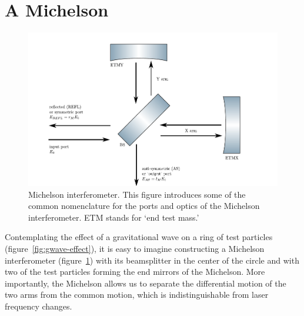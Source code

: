 \section{A Michelson}
\begin{figure}
\centering\includegraphics{figures/michelson.pdf}
\caption[Michelson interferometer]{\label{fig:michelson}Michelson
  interferometer.  This figure introduces some of the common
  nomenclature for the ports and optics of the Michelson
  interferometer.  ETM stands for `end test mass.'}
\end{figure}

Contemplating the effect of a gravitational wave on a ring of test
particles (figure~\ref{fig:gwave-effect}), it is easy to imagine
constructing a Michelson interferometer (figure~\ref{fig:michelson})
with its beamsplitter in the center of the circle and with two of the
test particles forming the end mirrors of the Michelson.  More
importantly, the Michelson allows us to separate the differential
motion of the two arms from the common motion, which is
indistinguishable from laser frequency changes.

